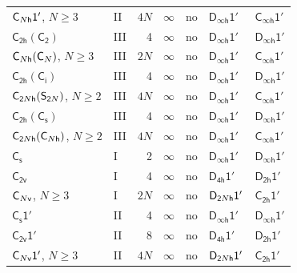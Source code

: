 \documentclass[10pt,a4paper]{article}
\makeatletter
\def\grouprule#1#2{\noalign{\marks\LTgroupmarks{\the\belowrulesep}\nobreak\vskip#1%
  \vskip\aboverulesep}\multispan\LT@cols\unskip{\leaders\hrule\@height#2\hfill\kern\z@}\cr
  \noalign{\penalty\LTrulebreak\vskip\belowrulesep\global\@lastruleclass\z@}}
\numberwithin{equation}{section}
\newcommand{\grp}[1]{\mathsf{#1}}
\makeatother
\begin{document}
{\begin{longtable}{@{}llrrlll@{}}
$\grp{C_{\mathnormal{N}h}1'}$, $N \ge 3$ & II & $4N$ & $\infty$ & no & \href{Dinfh-1p.pdf}{$\grp{D_{\infty h}1'}$} & \href{Cinfh-1p.pdf}{$\grp{C_{\infty h}1'}$}\\
\href{C2h-C2.pdf}{$\grp{C_{2h}}(\grp{C_{2}})$} & III & 4 & $\infty$ & no & \href{Dinfh-1p.pdf}{$\grp{D_{\infty h}1'}$} & \href{Dinfh-1p.pdf}{$\grp{D_{\infty h}1'}$}\\
$\grp{C_{\mathnormal{N}h}}(\grp{C_{\mathnormal{N}}})$, $N \ge 3$ & III & $2N$ & $\infty$ & no & \href{Dinfh-1p.pdf}{$\grp{D_{\infty h}1'}$} & \href{Cinfh-1p.pdf}{$\grp{C_{\infty h}1'}$}\\
\href{C2h-S2.pdf}{$\grp{C_{2h}}(\grp{C_{i}})$} & III & 4 & $\infty$ & no & \href{Dinfh-1p.pdf}{$\grp{D_{\infty h}1'}$} & \href{Dinfh-1p.pdf}{$\grp{D_{\infty h}1'}$}\\
$\grp{C_{2\mathnormal{N}h}}(\grp{S_{2\mathnormal{N}}})$, $N \ge 2$ & III & $4N$ & $\infty$ & no & \href{Dinfh-1p.pdf}{$\grp{D_{\infty h}1'}$} & \href{Cinfh-1p.pdf}{$\grp{C_{\infty h}1'}$}\\
\href{C2h-C1v.pdf}{$\grp{C_{2h}}(\grp{C_{s}})$} & III & 4 & $\infty$ & no & \href{Dinfh-1p.pdf}{$\grp{D_{\infty h}1'}$} & \href{Dinfh-1p.pdf}{$\grp{D_{\infty h}1'}$}\\
$\grp{C_{2\mathnormal{N}h}}(\grp{C_{\mathnormal{N}h}})$, $N \ge 2$ & III & $4N$ & $\infty$ & no & \href{Dinfh-1p.pdf}{$\grp{D_{\infty h}1'}$} & \href{Cinfh-1p.pdf}{$\grp{C_{\infty h}1'}$}\\
\grouprule{0pt}{\lightrulewidth}
\href{../../../rotation/data/pdf/C1v.pdf}{$\grp{C_{s}}$} & I & 2 & $\infty$ & no & \href{Dinfh-1p.pdf}{$\grp{D_{\infty h}1'}$} & \href{Dinfh-1p.pdf}{$\grp{D_{\infty h}1'}$}\\
\href{../../../rotation/data/pdf/C2v.pdf}{$\grp{C_{2v}}$} & I & 4 & $\infty$ & no & \href{D4h-1p.pdf}{$\grp{D_{4h}1'}$} & \href{D2h-1p.pdf}{$\grp{D_{2h}1'}$}\\
$\grp{C_{\mathnormal{N}v}}$, $N \ge 3$ & I & $2N$ & $\infty$ & no & $\grp{D_{2\mathnormal{N}h}1'}$ & \href{C2h-1p.pdf}{$\grp{C_{2h}1'}$}\\
\href{C1v-1p.pdf}{$\grp{C_{s}1'}$} & II & 4 & $\infty$ & no & \href{Dinfh-1p.pdf}{$\grp{D_{\infty h}1'}$} & \href{Dinfh-1p.pdf}{$\grp{D_{\infty h}1'}$}\\
\href{C2v-1p.pdf}{$\grp{C_{2v}1'}$} & II & 8 & $\infty$ & no & \href{D4h-1p.pdf}{$\grp{D_{4h}1'}$} & \href{D2h-1p.pdf}{$\grp{D_{2h}1'}$}\\
$\grp{C_{\mathnormal{N}v}1'}$, $N \ge 3$ & II & $4N$ & $\infty$ & no & $\grp{D_{2\mathnormal{N}h}1'}$ & \href{C2h-1p.pdf}{$\grp{C_{2h}1'}$}\\

\end{longtable}}
\end{document}
